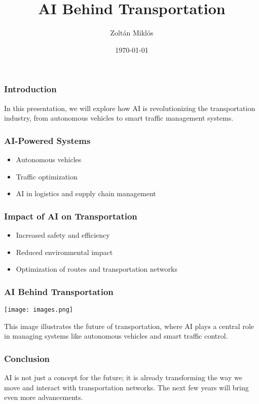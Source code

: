 \documentclass{beamer}
\title{AI Behind Transportation}
\author{Zoltán Miklós}
\date{\today}
\begin{document}
\begin{frame}[fragile=singleslide]
\titlepage
\end{frame}

\begin{frame}[fragile=singleslide]\frametitle{Introduction}
In this presentation, we will explore how AI is revolutionizing the transportation industry, from autonomous vehicles to smart traffic management systems.
\end{frame}

\begin{frame}[fragile=singleslide]\frametitle{AI-Powered Systems}
\begin{itemize}
    \item Autonomous vehicles
    \item Traffic optimization
    \item AI in logistics and supply chain management
\end{itemize}
\end{frame}

\begin{frame}[fragile=singleslide]\frametitle{Impact of AI on Transportation}
\begin{itemize}
    \item Increased safety and efficiency
    \item Reduced environmental impact
    \item Optimization of routes and transportation networks
\end{itemize}
\end{frame}

\begin{frame}[fragile=singleslide]\frametitle{AI Behind Transportation}
\begin{center}
\texttt{[image: images.png]} %
\end{center}
This image illustrates the future of transportation, where AI plays a central role in managing systems like autonomous vehicles and smart traffic control.
\end{frame}

\begin{frame}[fragile=singleslide]\frametitle{Conclusion}
AI is not just a concept for the future; it is already transforming the way we move and interact with transportation networks. The next few years will bring even more advancements.
\end{frame}
\end{document}
